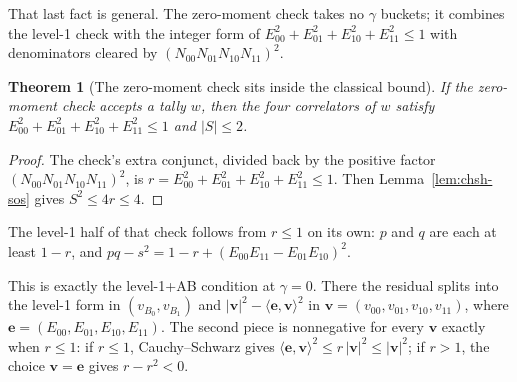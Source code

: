 \documentclass[11pt,twoside]{article}
\theoremstyle{thielethm}
\newtheorem{theorem}{Theorem}[section]
\theoremstyle{thieledef}
\theoremstyle{thieledef}
\theoremstyle{thieledef}
\theoremstyle{thielethm}
\theoremstyle{thieleobs}
\theoremstyle{thielethm}
\begin{document}
That last fact is general. The zero-moment check takes no $\gamma$ buckets; it combines
the level-1 check with the integer form of
$E_{00}^2 + E_{01}^2 + E_{10}^2 + E_{11}^2 \le 1$ with denominators cleared by
$(N_{00} N_{01} N_{10} N_{11})^2$.

\begin{theorem}[The zero-moment check sits inside the classical bound]\label{thm:chsh-gzero}
If the zero-moment check accepts a tally $w$, then the four correlators of $w$ satisfy
$E_{00}^2 + E_{01}^2 + E_{10}^2 + E_{11}^2 \le 1$
 and $|S| \le 2$.
\end{theorem}

\begin{proof}
The check's extra conjunct, divided back by the positive factor
$(N_{00} N_{01} N_{10} N_{11})^2$, is $r = E_{00}^2 + E_{01}^2 + E_{10}^2 + E_{11}^2 \le 1$.
Then Lemma~\ref{lem:chsh-sos} gives $S^2 \le 4 r \le 4$.
\end{proof}

The level-1 half of that check follows from $r \le 1$ on its own: $p$ and $q$ are each at least
$1 - r$, and $pq - s^2 = 1 - r + (E_{00}E_{11} - E_{01}E_{10})^2$.

This is exactly the level-1+AB condition at $\gamma = 0$. There the residual splits into the
level-1 form in $(v_{B_0}, v_{B_1})$ and
$|\mathbf v|^2 - \langle \mathbf e, \mathbf v \rangle^2$ in
$\mathbf v = (v_{00}, v_{01}, v_{10}, v_{11})$, where
$\mathbf e = (E_{00}, E_{01}, E_{10}, E_{11})$. The second piece is nonnegative for every
$\mathbf v$ exactly when $r \le 1$: if $r \le 1$, Cauchy--Schwarz gives
$\langle \mathbf e, \mathbf v \rangle^2 \le r\,|\mathbf v|^2 \le |\mathbf v|^2$; if $r > 1$, the
choice $\mathbf v = \mathbf e$ gives $r - r^2 < 0$.
\end{document}
